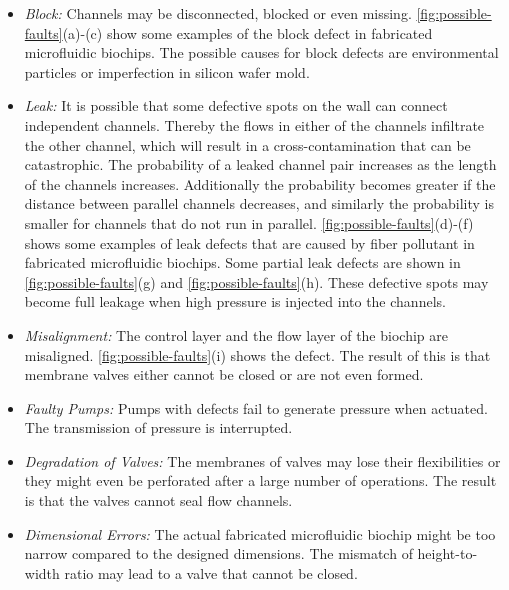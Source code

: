 \begin{itemize}
\item \emph{Block:} Channels may be disconnected, blocked or even missing. \autoref{fig:possible-faults}(a)-(c) show some examples of the block defect in fabricated microfluidic biochips. The possible causes for block defects are environmental particles or imperfection in silicon wafer mold.

\item \emph{Leak:} It is possible that some defective spots on the wall can connect independent channels. Thereby the flows in either of the channels infiltrate the other channel, which will result in a cross-contamination that can be catastrophic. The probability of  a leaked channel pair increases as the length of the channels increases. Additionally the probability becomes greater if the distance between parallel channels decreases, and similarly the probability is smaller for channels that do not run in parallel. \autoref{fig:possible-faults}(d)-(f) shows some examples of leak defects that are caused by fiber pollutant in fabricated microfluidic biochips. Some partial leak defects are shown in \autoref{fig:possible-faults}(g) and \autoref{fig:possible-faults}(h). These defective spots may become full leakage when high pressure is injected into the channels.

\item \emph{Misalignment:} The control layer and the flow layer of the biochip are misaligned. \autoref{fig:possible-faults}(i) shows the defect. The result of this is that membrane valves either cannot be closed or are not even formed.

\item \emph{Faulty Pumps:} Pumps with defects fail to generate pressure when actuated. The transmission of pressure is interrupted.

\item \emph{Degradation of Valves:} The membranes of valves may lose their flexibilities or they might even be perforated after a large number of operations. The result is that the valves cannot seal flow channels.

\item \emph{Dimensional Errors:} The actual fabricated microfluidic biochip might be too narrow compared to the designed dimensions. The mismatch of height-to-width ratio may lead to a valve that cannot be closed.

\end{itemize}

